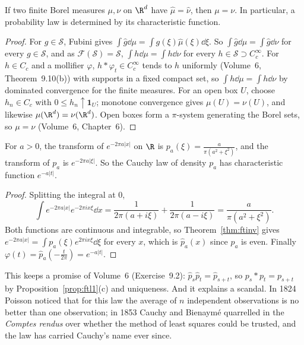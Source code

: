 \begin{theorem}\label{thm:measuniq}
If two finite Borel measures $\mu,\nu$ on $\R^d$ have $\hat\mu=\hat\nu$, then $\mu=\nu$. In particular, a probability law is determined by its characteristic function.
\end{theorem}
\begin{proof}
For $g\in\mathcal S$, Fubini gives $\int\hat g\dd\mu=\int g(\xi)\hat\mu(\xi)\dd\xi$. So $\int\hat g\dd\mu=\int\hat g\dd\nu$ for every $g\in\mathcal S$, and as $\mathcal F(\mathcal S)=\mathcal S$, $\int h\dd\mu=\int h\dd\nu$ for every
$h\in\mathcal S\supset C_c^\infty$. For $h\in C_c$ and a mollifier $\varphi$, $h*\varphi_t\in C_c^\infty$ tends to $h$ uniformly (Volume~6, Theorem~9.10(b)) with supports in a fixed compact set, so $\int h\dd\mu=\int h\dd\nu$
by dominated convergence for the finite measures. For an open box $U$, choose $h_n\in C_c$ with $0\le h_n\uparrow\mathbf 1_U$; monotone convergence gives $\mu(U)=\nu(U)$, and likewise $\mu(\R^d)=\nu(\R^d)$. Open boxes form a
$\pi$-system generating the Borel sets, so $\mu=\nu$ (Volume~6, Chapter~6).
\end{proof}

\begin{proposition}\label{prop:cauchylaw}
For $a>0$, the transform of $e^{-2\pi a|x|}$ on $\R$ is $p_a(\xi)=\frac a{\pi(a^2+\xi^2)}$, and the transform of $p_a$ is $e^{-2\pi a|\xi|}$. So the Cauchy law of density $p_a$ has characteristic function $e^{-a|t|}$.
\end{proposition}
\begin{proof}
Splitting the integral at $0$,
\[\int e^{-2\pi a|x|}e^{-2\pi ix\xi}\dd x=\frac1{2\pi(a+i\xi)}+\frac1{2\pi(a-i\xi)}=\frac a{\pi(a^2+\xi^2)}.\]
Both functions are continuous and integrable, so Theorem~\ref{thm:ftinv} gives $e^{-2\pi a|x|}=\int p_a(\xi)e^{2\pi ix\xi}\dd\xi$ for every $x$, which is $\hat p_a(x)$ since $p_a$ is even. Finally
$\varphi(t)=\hat p_a(-\frac t{2\pi})=e^{-a|t|}$.
\end{proof}

This keeps a promise of Volume~6 (Exercise~9.2): $\hat p_s\hat p_t=\hat p_{s+t}$, so $p_s*p_t=p_{s+t}$ by Proposition~\ref{prop:ftl1}(c) and uniqueness. And it explains a scandal. In 1824 Poisson noticed that for
this law the average of $n$ independent observations is no better than one observation; in 1853 Cauchy and Bienaym\'e quarrelled in the \emph{Comptes rendus} over whether the method of least squares could be
trusted, and the law has carried Cauchy's name ever since.

